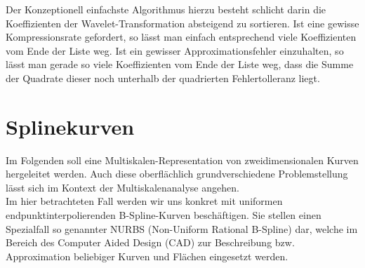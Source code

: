 Der Konzeptionell einfachste Algorithmus hierzu besteht schlicht darin die Koeffizienten der Wavelet-Transformation absteigend zu sortieren. Ist eine gewisse Kompressionsrate gefordert, so lässt man einfach entsprechend viele Koeffizienten vom Ende der Liste weg. Ist ein gewisser Approximationsfehler einzuhalten, so lässt man gerade so viele Koeffizienten vom Ende der Liste weg, dass die Summe der Quadrate dieser noch unterhalb der quadrierten Fehlertolleranz liegt.
%

\section{Splinekurven}
%
%
%
%
Im Folgenden soll eine Multiskalen-Representation von zweidimensionalen Kurven hergeleitet werden. Auch diese oberflächlich grundverschiedene Problemstellung lässt sich im Kontext der Multiskalenanalyse angehen. \\
%
Im hier betrachteten Fall werden wir uns konkret mit uniformen endpunktinterpolierenden B-Spline-Kurven beschäftigen. Sie stellen einen Spezialfall so genannter NURBS (Non-Uniform Rational B-Spline) dar, welche im Bereich des Computer Aided Design (CAD) zur Beschreibung bzw. Approximation beliebiger Kurven und Flächen eingesetzt werden.
%
